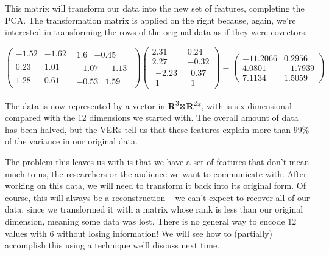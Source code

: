 \documentclass[oneside,english]{amsbook}
\numberwithin{section}{chapter}
\theoremstyle{plain}
\theoremstyle{definition}
\begin{document}
This matrix will transform our data into the new set of features,
completing the PCA. The transformation matrix is applied on the right
because, again, we're interested in transforming the rows of the
original data as if they were covectors:

\[\begin{pmatrix}
	- 1.52 & - 1.62 & \begin{matrix}
		1.6 & - 0.45
	\end{matrix} \\
	0.23 & 1.01 & \begin{matrix}
		- 1.07 & - 1.13
	\end{matrix} \\
	1.28 & 0.61 & \begin{matrix}
		- 0.53 & 1.59
	\end{matrix}
\end{pmatrix}\begin{pmatrix}
	2.31 & 0.24 \\
	2.27 & - 0.32 \\
	\begin{matrix}
		- 2.23 \\
		1
	\end{matrix} & \begin{matrix}
		0.37 \\
		1
	\end{matrix}
\end{pmatrix} = \begin{pmatrix}
	- 11.2066 & 0.2956 \\
	4.0801 & - 1.7939 \\
	7.1134 & 1.5059
\end{pmatrix}\]

The data is now represented by a vector in
\textbf{R}\textsuperscript{3}⊗\textbf{R}\textsuperscript{2}*, with is
six-dimensional compared with the 12 dimensions we started with. The
overall amount of data has been halved, but the VERs tell us that these
features explain more than 99\% of the variance in our original data.

The problem this leaves us with is that we have a set of features that
don't mean much to us, the researchers or the audience we want to
communicate with. After working on this data, we will need to transform
it back into its original form. Of course, this will always be a
reconstruction -- we can't expect to recover all of our data, since we
transformed it with a matrix whose rank is less than our original
dimension, meaning some data was lost. There is no general way to encode
12 values with 6 without losing information! We will see how to
(partially) accomplish this using a technique we'll discuss next time.
\end{document}
